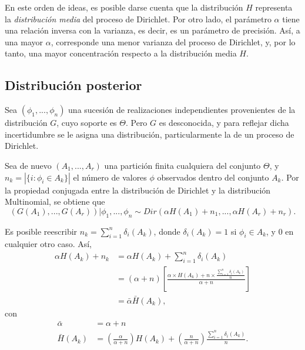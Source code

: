 En este orden de ideas, es posible darse cuenta que la distribuci\'on $H$ representa la \textit{distribuci\'on media} del proceso de Dirichlet. Por otro lado, el par\'ametro $\alpha$ tiene una relaci\'on inversa con la varianza, es decir, es un par\'ametro de precisi\'on. As\'i, a una mayor $\alpha$, corresponde una menor varianza del proceso de Dirichlet, y, por lo tanto, una mayor concentraci\'on respecto a la distribuci\'on media $H$. 

\subsection{Distribuci\'on posterior}

Sea $(\phi_1,..., \phi_n)$ una sucesi\'on de realizaciones independientes provenientes de la distribuci\'on $G$, cuyo soporte es $\Theta$. Pero $G$ es desconocida, y para reflejar dicha incertidumbre se le asigna una distribuci\'on, particularmente la de un proceso de Dirichlet.

Sea de nuevo $(A_1,...,A_r)$ una partici\'on finita cualquiera del conjunto $\Theta$, y $n_k = |\{i: \phi_i \in A_k\}|$ el n\'umero de valores $\phi$ observados dentro del conjunto $A_k$. Por la propiedad conjugada entre la distribuci\'on de Dirichlet y la distribuci\'on Multinomial, se obtiene que
\begin{equation*}
   (G(A_1),...,G(A_r))|\phi_1,...,\phi_n \sim Dir(\alpha H(A_1) + n_1,...,\alpha H(A_r) + n_r). 
\end{equation*}

Es posible reescribir $n_k = \sum_{i=1}^n \delta_i(A_k)$, donde $\delta_i(A_k) = 1$ si $\phi_i \in A_k$, y $0$ en cualquier otro caso. As\'i,
\begin{equation*}
\begin{aligned}
    \alpha H(A_k) + n_k 
    &= \alpha H(A_k) + \sum_{i=1}^n \delta_i(A_k) \\
    &= (\alpha + n)
    \left[
        \frac{\alpha \times H(A_k) + n \times \frac{\sum_{i=1}^n \delta_i(A_k)}{n}}{\alpha + n}
    \right] \\
    &= \bar{\alpha} \bar{H}(A_k),
\end{aligned}
\end{equation*}
con
\begin{equation*}
\begin{aligned}
    \bar{\alpha} &= \alpha + n \\
    \bar{H}(A_k) &=  
        \left(\frac{\alpha}{\alpha + n}\right)H(A_k) + 
        \left(\frac{n}{\alpha + n}\right)\frac{\sum_{i=1}^n \delta_i(A_k)}{n}.
\end{aligned}
\end{equation*}

